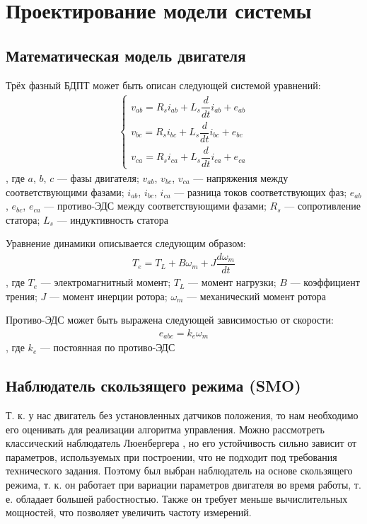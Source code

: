 \chapter{Проектирование модели системы}
\label{cha:chap4}

\section{Математическая модель двигателя}

Трёх фазный БДПТ может быть описан следующей системой уравнений\cite{art:dtc_smo}: 
\begin{align}
\label{sys:abc}
\left\{ \begin{aligned} 
  v_{ab}=R_si_{ab}+L_s\dfrac{d}{dt}i_{ab}+e_{ab}\\
  v_{bc}=R_si_{bc}+L_s\dfrac{d}{dt}i_{bc}+e_{bc}\\
  v_{ca}=R_si_{ca}+L_s\dfrac{d}{dt}i_{ca}+e_{ca}
\end{aligned} \right.
\end{align}, где $a$, $b$, $c$ --- фазы двигателя; $v_{ab}$, $v_{bc}$, $v_{ca}$ --- напряжения между соответствующими фазами; $i_{ab}$, $i_{bc}$, $i_{ca}$ --- разница токов соответствующих фаз; $e_{ab}$, $e_{bc}$, $e_{ca}$ --- противо-ЭДС между соответствующими фазами; $R_s$ --- сопротивление статора; $L_s$ --- индуктивность статора

Уравнение динамики описывается следующим образом:
\begin{align*}
	T_e = T_L+B\omega_m+J\dfrac{d\omega_m}{dt}
\end{align*}, где $T_e$ --- электромагнитный момент; $T_L$ --- момент нагрузки; $B$ --- коэффициент трения; $J$ --- момент инерции ротора; $\omega_m$ --- механический момент ротора

Противо-ЭДС может быть выражена следующей зависимостью от скорости:
\begin{align*}
	e_{abc}=k_e\omega_m
\end{align*}, где $k_e$ --- постоянная по противо-ЭДС

\section{Наблюдатель скользящего режима (SMO)}
\label{sec:smo}

Т. к. у нас двигатель без установленных датчиков положения, то нам необходимо его оценивать для реализации алгоритма управления. Можно рассмотреть классический наблюдатель Люенбергера \cite{art:obs_luen_bldc}, но его устойчивость сильно зависит от параметров, используемых при построении, что не подходит под требования технического задания. Поэтому был выбран наблюдатель на основе скользящего режима, т. к. он работает при вариации параметров двигателя во время работы, т. е. обладает большей рабостностью. Также он требует меньше вычислительных мощностей, что позволяет увеличить частоту измерений.

